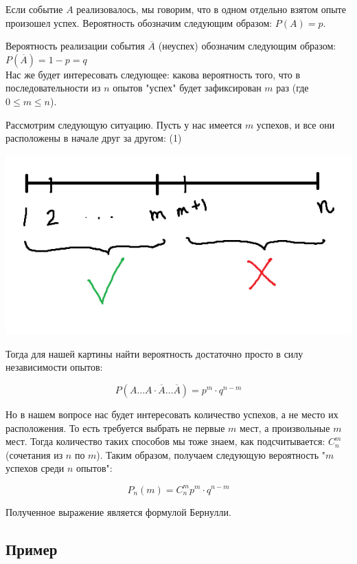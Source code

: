 \documentclass{article}
\begin{document}
Если событие $A$ реализовалось, мы говорим, что в одном отдельно взятом опыте произошел успех. Вероятность обозначим следующим образом: $P(A) = p$.

Вероятность реализации события $\overline{A}$ (неуспех) обозначим следующим образом: $P(\overline{A}) = 1 - p = q$
\\

Нас же будет интересовать следующее: какова вероятность того, что в последовательности из $n$ опытов "успех" будет зафиксирован $m$ раз (где $0 \leq m \leq n$).

Рассмотрим следующую ситуацию. Пусть у нас имеется $m$ успехов, и все они расположены в начале друг за другом: (1)

\begin{center}
    \includegraphics[scale=0.6]{3.png}
\end{center}

Тогда для нашей картины найти вероятность достаточно просто в силу независимости опытов:

$$P(A\ldots A\cdot\overline{A}\ldots\overline{A}) = p^m \cdot q^{n - m}$$

Но в нашем вопросе нас будет интересовать количество успехов, а не место их расположения. То есть требуется выбрать не первые $m$ мест, а произвольные $m$ мест. Тогда количество таких способов мы тоже знаем, как подсчитывается: $C_n^m$ (сочетания из $n$ по $m$). Таким образом, получаем следующую вероятность "$m$ успехов среди $n$ опытов":

$$P_n(m) = C_n^m p^m \cdot q^{n - m} $$

Полученное выражение является формулой Бернулли.

\subsection{Пример}
\end{document}
